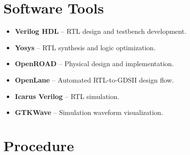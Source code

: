 \documentclass[12pt,a4paper]{report}
\begin{document}
\section{Software Tools}

\begin{itemize}
    \item \textbf{Verilog HDL} -- RTL design and testbench development.
    \item \textbf{Yosys} -- RTL synthesis and logic optimization.
    \item \textbf{OpenROAD} -- Physical design and implementation.
    \item \textbf{OpenLane} -- Automated RTL-to-GDSII design flow.
    \item \textbf{Icarus Verilog} -- RTL simulation.
    \item \textbf{GTKWave} -- Simulation waveform visualization.
\end{itemize}

\section{Procedure}
\end{document}
